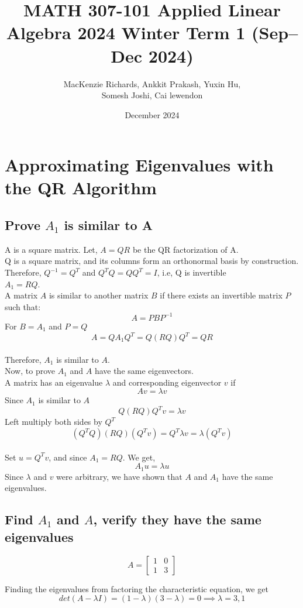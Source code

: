 \documentclass[12pt]{article}
\title{MATH 307-101
Applied Linear Algebra
2024 Winter Term 1 (Sep–Dec 2024)}
\author{MacKenzie Richards, Ankkit Prakash, Yuxin Hu, \\ Somesh Joshi, Cai lewendon}
\date{December 2024}
\begin{document}
\maketitle
\section{Approximating Eigenvalues with the QR Algorithm}
\subsection{Prove $A_1$ is similar to A}
    A is a square matrix. Let, $A = QR$ be the QR factorization of A. \\
    Q is a square matrix, and its columns form an orthonormal basis by construction. \\
    Therefore, $Q^{-1} = Q^T$ and $Q^{T}Q = QQ^T = I$, i.e, Q is invertible\\
    $A_1 = RQ$.\\ 
    A matrix $A$ is similar to another matrix $B$ if there exists an invertible matrix $P$ such that:
    $$A = PBP^{-1}$$
    For $B = A_1$ and $P = Q$ \\
    $$A = QA_{1}Q^T = Q (RQ) Q^T = QR$$ \\
    Therefore, $A_1$ is similar to $A$. \\ 
    Now, to prove $A_1$ and $A$ have the same eigenvectors. \\
    A matrix has an eigenvalue $\lambda$ and corresponding eigenvector $v$ if \\
    $$Av = \lambda v$$
    Since $A_1$ is similar to $A$
    $$Q (RQ) Q^T v = \lambda v$$
    Left multiply both sides by $Q^T$
    $$ (Q^{T}Q) (RQ) (Q^{T}v) = Q^{T} \lambda v = \lambda (Q^{T}v)$$ \\
    Set $u = Q^{T} v$, and since $A_1 = RQ$. We get, \\
    $$ A_1 u = \lambda u$$
    Since $\lambda$ and $v$ were arbitrary, we have shown that $A$ and $A_1$ have the same eigenvalues.

\subsection{Find $A_1$ and $A$, verify they have the same eigenvalues}

$$
A = \begin{bmatrix}
1 & 0 \\
1 & 3 
\end{bmatrix} 
$$

    Finding the eigenvalues from factoring the characteristic equation, we get \\
    $$det(A - \lambda I) = (1 - \lambda)(3 - \lambda) = 0 \implies \lambda = 3,1$$ \\
\end{document}
